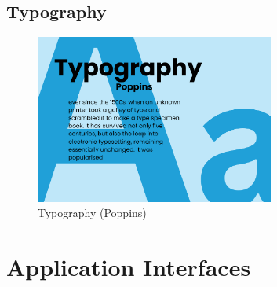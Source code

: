 \subsection{Typography}

\begin{figure}[H]
    \centering
    \includegraphics[width=0.7\textwidth]{images/1.png}
    \caption{Typography (Poppins)}
    \label{fig:figure4}
\end{figure}






\section{ Application Interfaces}







